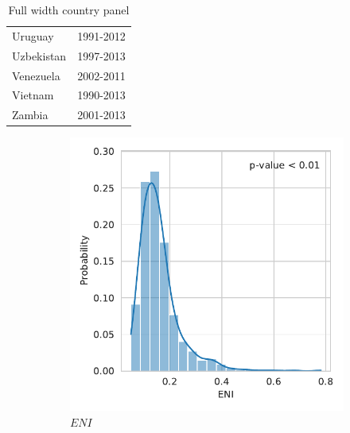 \documentclass[12pt,a4paper]{article}
\begin{document}
\begin{table}[htbp]
\begin{subtable}{0.45\textwidth}
\begin{tabular}{ll}
                   Uruguay &  1991-2012 \\
                Uzbekistan &  1997-2013 \\
                 Venezuela &  2002-2011 \\
                   Vietnam &  1990-2013 \\
                    Zambia &  2001-2013 \\
\bottomrule
\end{tabular}
\end{subtable}
\caption{Full width country panel}
\label{tab:all_countries}
\end{table}


\begin{figure}[htbp]
\centering
\begin{subfigure}{0.45\textwidth}
\includegraphics[width=\textwidth]{./plots/dis/distplot_ENI.pdf}
\caption{$ENI$}
\end{subfigure}
\begin{subfigure}{0.45\textwidth}

\end{subfigure}
\end{figure}
\end{document}
